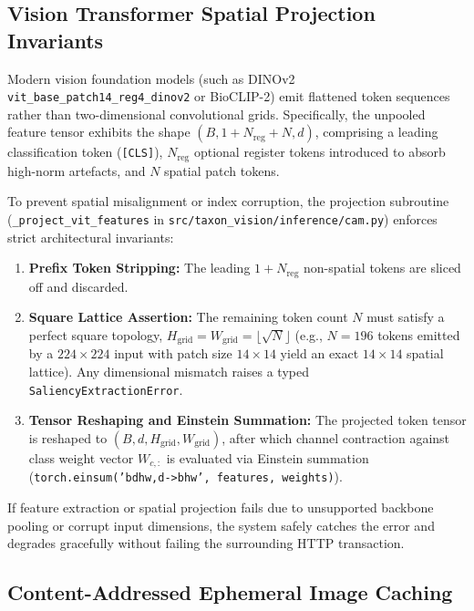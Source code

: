\subsection{Vision Transformer Spatial Projection Invariants}
\label{subsec:cam_vit_projection}

Modern vision foundation models (such as DINOv2 \texttt{vit\_base\_patch14\_reg4\_dinov2} or BioCLIP-2) emit flattened token sequences rather than two-dimensional convolutional grids. Specifically, the unpooled feature tensor exhibits the shape $(B, 1 + N_{\text{reg}} + N, d)$, comprising a leading classification token (\texttt{[CLS]}), $N_{\text{reg}}$ optional register tokens introduced to absorb high-norm artefacts, and $N$ spatial patch tokens.

To prevent spatial misalignment or index corruption, the projection subroutine (\nolinkurl{_project_vit_features} in \nolinkurl{src/taxon_vision/inference/cam.py}) enforces strict architectural invariants:
\begin{enumerate}
    \item \textbf{Prefix Token Stripping:} The leading $1 + N_{\text{reg}}$ non-spatial tokens are sliced off and discarded.
    \item \textbf{Square Lattice Assertion:} The remaining token count $N$ must satisfy a perfect square topology, $H_{\text{grid}} = W_{\text{grid}} = \lfloor\sqrt{N}\rfloor$ (e.g., $N = 196$ tokens emitted by a $224 \times 224$ input with patch size $14 \times 14$ yield an exact $14 \times 14$ spatial lattice). Any dimensional mismatch raises a typed \texttt{SaliencyExtractionError}.
    \item \textbf{Tensor Reshaping and Einstein Summation:} The projected token tensor is reshaped to $(B, d, H_{\text{grid}}, W_{\text{grid}})$, after which channel contraction against class weight vector $W_{c, :}$ is evaluated via Einstein summation (\texttt{torch.einsum('bdhw,d->bhw', features, weights)}).
\end{enumerate}
If feature extraction or spatial projection fails due to unsupported backbone pooling or corrupt input dimensions, the system safely catches the error and degrades gracefully without failing the surrounding HTTP transaction.

\subsection{Content-Addressed Ephemeral Image Caching}
\label{subsec:cam_ephemeral_cache}

